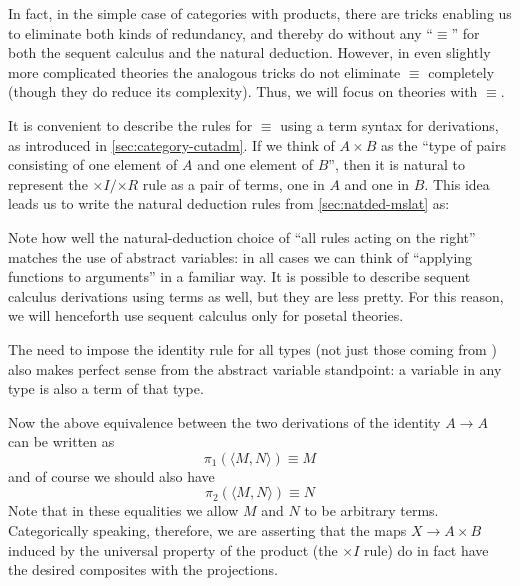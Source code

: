 \documentclass{book}
\def\idfunc{\mathsf{id}}
\let\types\vdash
\def\type{\;\ftype}
\def\unit{\mathbf{1}}
\def\ttt{\mathsf{tt}}
\def\timesE{\ensuremath{\mathord{\times}E}}
\def\timesI{\ensuremath{\mathord{\times}I}}
\def\timesR{\ensuremath{\mathord{\times}R}}
\def\pair#1#2{\langle #1,#2\rangle}
\begin{document}
In fact, in the simple case of categories with products, there are tricks enabling us to eliminate {both} kinds of redundancy, and thereby do without any ``$\equiv$'' for both the sequent calculus and the natural deduction.
However, in even slightly more complicated theories the analogous tricks do not eliminate $\equiv$ completely (though they do reduce its complexity).
Thus, we will focus on theories with $\equiv$.

It is convenient to describe the rules for $\equiv$ using a term syntax for derivations, as introduced in \cref{sec:category-cutadm}.
If we think of $A\times B$ as the ``type of pairs consisting of one element of $A$ and one element of $B$'', then it is natural to represent the $\timesI/\timesR$ rule as a pair of terms, one in $A$ and one in $B$.
This idea leads us to write the natural deduction rules from \cref{sec:natded-mslat} as:
Note how well the natural-deduction choice of ``all rules acting on the right'' matches the use of abstract variables: in all cases we can think of ``applying functions to arguments'' in a familiar way.
It is possible to describe sequent calculus derivations using terms as well, but they are less pretty.
For this reason, we will henceforth use sequent calculus only for posetal theories.

The need to impose the identity rule for all types (not just those coming from \cG) also makes perfect sense from the abstract variable standpoint: a variable in any type is also a term of that type.

Now the above equivalence between the two derivations of the identity $A\to A$ can be written as
\begin{equation}
  \pi_1(\pair M N) \equiv M\label{eq:beta-prodcat-1}
\end{equation}
and of course we should also have
\begin{equation}
  \pi_2(\pair M N) \equiv N\label{eq:beta-prodcat-2}
\end{equation}
Note that in these equalities we allow $M$ and $N$ to be arbitrary terms.
Categorically speaking, therefore, we are asserting that the maps $X\to A\times B$ induced by the universal property of the product (the $\timesI$ rule) do in fact have the desired composites with the projections.
\end{document}
